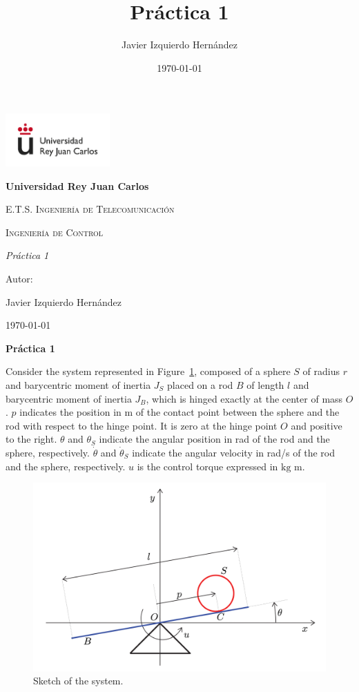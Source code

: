 \documentclass{article}
\title{Práctica 1}
\author{Javier Izquierdo Hernández}
\date{\today}
\begin{document}
	\begin{titlepage}
		\centering
		{\includegraphics[width=0.3\textwidth]{figures/logo}\par}
		\vspace{1cm}
		{\bfseries\LARGE Universidad Rey Juan Carlos \par}
		\vspace{1cm}
		{\scshape\Large E.T.S. Ingeniería de Telecomunicación \par}
		\vspace{3cm}
		{\scshape\Huge Ingeniería de Control \par}
		\vspace{3cm}
		{\itshape\Large Práctica 1 \par}
		\vfill
		{\Large Autor: \par}
		{\Large Javier Izquierdo Hernández \par}
		\vfill
		{\Large \today \par}
	\end{titlepage}
\begin{center}
{\huge \bf Práctica 1}
\end{center}


Consider the system represented in Figure~\ref{fig:figure_1}, composed of a sphere $S$ of radius $r$ and barycentric moment of inertia $J_S$ placed on a rod $B$ of length $l$ and barycentric moment of inertia $J_B$, which is hinged exactly at the center of mass $O$. 
$p$ indicates the position in m of the contact point between the sphere and the rod with respect to the hinge point. It is zero at the hinge point $O$ and positive to the right.
$\theta$ and $\theta_S$ indicate the angular position in rad of the rod and the sphere, respectively. 
$\dot{\theta}$ and $\dot{\theta}_S$ indicate the angular velocity in rad/s of the rod and the sphere, respectively. $u$ is the control torque expressed in $\text{kg m}$.


\begin{figure}[H]
\centerline{\hspace{1.25cm}\includegraphics[width=0.8\columnwidth]{figures/figure_1_a}}
\caption{Sketch of the system.}
\label{fig:figure_1}
\end{figure}
\end{document}
